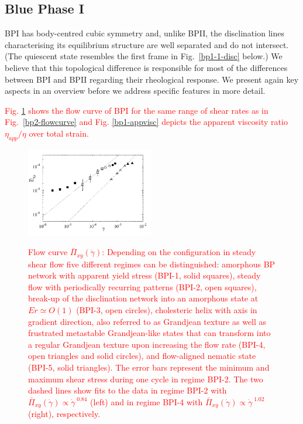 \documentclass[8.5pt,twoside,twocolumn]{article}
\newcommand{\gd}{\dot{\gamma}}
\newcommand{\rev}[1]{{\textcolor{red}{#1}}}
\begin{document}
\subsection{Blue Phase I}

BPI has body-centred cubic symmetry and, unlike BPII, the disclination lines
characterising its equilibrium structure are well separated and do not 
intersect. (The quiescent state resembles the first frame in Fig.~\ref{bp1-1-disc}
below.)
We believe that this topological difference is responsible for most of
the differences between BPI and BPII regarding their rheological response. 
We present again key aspects in an overview before we address specific features 
in more detail. 

\rev{
Fig. \ref{bp1-flowcurve} shows the flow curve of BPI for the same range of
shear rates as in Fig.~\ref{bp2-flowcurve} and Fig. \ref{bp1-appvisc} depicts 
the apparent viscosity ratio $\eta_{app}/\eta$ over total strain.
}

\begin{figure}[htpb]
\includegraphics[width=0.495\textwidth]{flowcurve_bp1.pdf}\\
\caption{
\rev{
Flow curve $\bar{\Pi}_{xy}(\gd)$: 
Depending on the configuration in steady shear flow five different regimes 
can be distinguished: amorphous BP network with apparent yield stress (BPI-1, solid squares), 
steady flow with periodically recurring patterns (BPI-2, open squares), 
break-up of the disclination network into an amorphous state at $Er\simeq O(1)$ (BPI-3, open circles),
cholesteric helix with axis in gradient direction, also referred to
as Grandjean texture as well as frustrated metastable Grandjean-like states that can transform into 
a regular Grandjean texture upon increasing the flow rate (BPI-4, open triangles and solid circles),
and flow-aligned nematic state (BPI-5, solid triangles). 
The error bars represent the minimum and maximum shear stress 
during one cycle in regime BPI-2.
The two dashed lines show fits to the data in regime BPI-2 with 
$\bar{\Pi}_{xy}(\gd)\propto \gd^{\;0.84}$ (left) 
and in regime BPI-4 with 
$\bar{\Pi}_{xy}(\gd)\propto \gd^{\;1.02}$ (right), respectively.}
}
\label{bp1-flowcurve}
\end{figure}
\end{document}
